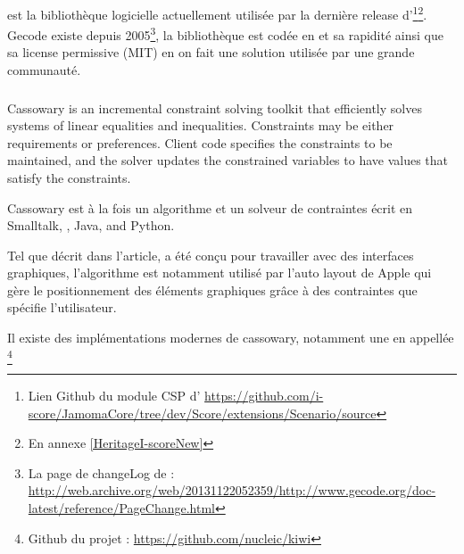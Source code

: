 \subsubsection{\gecode{}}

\gecode{} est la bibliothèque logicielle actuellement utilisée par la dernière release d'\iscore{}\footnote{Lien Github du module CSP d'\iscore{} \url{https://github.com/i-score/JamomaCore/tree/dev/Score/extensions/Scenario/source}}\footnote{En annexe \ref{HeritageI-scoreNew}}. 
Gecode existe depuis 2005\footnote{La page de changeLog de \gecode{} : \url{http://web.archive.org/web/20131122052359/http://www.gecode.org/doc-latest/reference/PageChange.html} \archive{}}, la bibliothèque est codée en \cpp{} et sa rapidité\cite{Minizinc2015} ainsi que sa license permissive (MIT\cite{Mit2015}) en on fait une solution utilisée par une grande communauté.

\subsubsection{\cassowary{}}

\begin{citeauteur}
Cassowary is an incremental constraint solving toolkit that efficiently solves systems of linear equalities and inequalities. Constraints may be either requirements or preferences. Client code specifies the constraints to be maintained, and the solver updates the constrained variables to have values that satisfy the constraints.
\end{citeauteur}

Cassowary est à la fois un algorithme\cite{Borning:1997:SLA:263407.263518} et un solveur de contraintes\cite{Badros98thecassowary} écrit en Smalltalk, \cpp{}, Java, and Python\footnotemark[\value{footnote}]{}.


Tel que décrit dans l'article\cite{Borning:1997:SLA:263407.263518}, \cassowary{} a été conçu pour travailler avec des interfaces graphiques, l'algorithme est notamment utilisé par l'auto layout de Apple\cite{sadun2013ios} qui gère le positionnement des éléments graphiques grâce à des contraintes que spécifie l'utilisateur.

Il existe des implémentations modernes de cassowary, notamment une en \cpp{} appellée \kiwi{}\footnote{Github du projet \kiwi{} : \url{https://github.com/nucleic/kiwi}}

